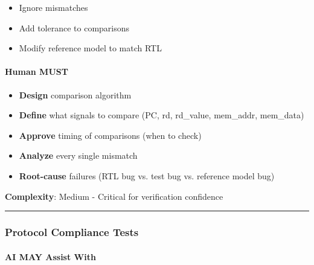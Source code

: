 \begin{record}

\begin{itemize}
\tightlist
\item
  Ignore mismatches
\item
  Add tolerance to comparisons
\item
  Modify reference model to match RTL
\end{itemize}

\end{record}

\paragraph{\texorpdfstring{\hold{} Human MUST}{ Human MUST}}\label{cr:status:phase1-ai-human-responsibilities:raised-hand-human-must-13}

\begin{record}

\begin{itemize}
\tightlist
\item
  \textbf{Design} comparison algorithm
\item
  \textbf{Define} what signals to compare (PC, rd, rd\_value, mem\_addr,
  mem\_data)
\item
  \textbf{Approve} timing of comparisons (when to check)
\item
  \textbf{Analyze} every single mismatch
\item
  \textbf{Root-cause} failures (RTL bug vs. test bug vs. reference model
  bug)
\end{itemize}

\textbf{Complexity}: \partialmark{} Medium - Critical for verification
confidence

\begin{center}\rule{0.5\linewidth}{0.5pt}\end{center}

\end{record}

\subsubsection{Protocol Compliance Tests}\label{cr:status:phase1-ai-human-responsibilities:protocol-compliance-tests}

\paragraph{\texorpdfstring{\ok{} AI MAY Assist
With}{ AI MAY Assist With}}\label{cr:status:phase1-ai-human-responsibilities:white-check-mark-ai-may-assist-with-14}

